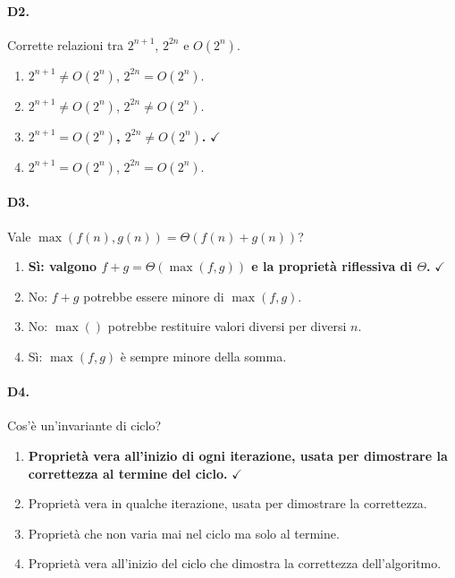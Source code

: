 \paragraph{D2.} Corrette relazioni tra $2^{n+1}$, $2^{2n}$ e $O(2^n)$.
\begin{enumerate}[label=\Alph*.,leftmargin=*]
	\item $2^{n+1} \neq O(2^n)$, $2^{2n} = O(2^n)$.
	\item $2^{n+1} \neq O(2^n)$, $2^{2n} \neq O(2^n)$.
	\item \textcolor{correctgreen}{\textbf{$2^{n+1} = O(2^n)$, $2^{2n} \neq O(2^n)$.}} \hfill\textcolor{correctgreen}{$\checkmark$}
	\item $2^{n+1} = O(2^n)$, $2^{2n} = O(2^n)$.
\end{enumerate}

\paragraph{D3.} Vale $\max(f(n), g(n)) = \Theta(f(n) + g(n))$?
\begin{enumerate}[label=\Alph*.,leftmargin=*]
	\item \textcolor{correctgreen}{\textbf{S\`i: valgono $f+g = \Theta(\max(f,g))$ e la propriet\`a riflessiva di $\Theta$.}} \hfill\textcolor{correctgreen}{$\checkmark$}
	\item No: $f+g$ potrebbe essere minore di $\max(f,g)$.
	\item No: $\max()$ potrebbe restituire valori diversi per diversi $n$.
	\item S\`i: $\max(f,g)$ \`e sempre minore della somma.
\end{enumerate}

\paragraph{D4.} Cos'\`e un'invariante di ciclo?
\begin{enumerate}[label=\Alph*.,leftmargin=*]
	\item \textcolor{correctgreen}{\textbf{Propriet\`a vera all'inizio di ogni iterazione, usata per dimostrare la correttezza al termine del ciclo.}} \hfill\textcolor{correctgreen}{$\checkmark$}
	\item Propriet\`a vera in qualche iterazione, usata per dimostrare la correttezza.
	\item Propriet\`a che non varia mai nel ciclo ma solo al termine.
	\item Propriet\`a vera all'inizio del ciclo che dimostra la correttezza dell'algoritmo.
\end{enumerate}

